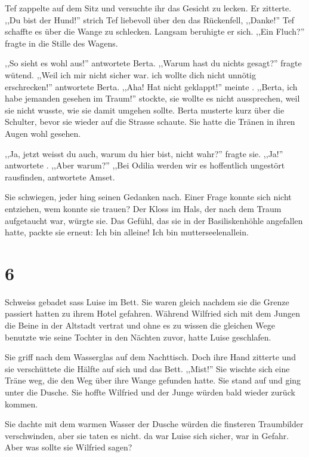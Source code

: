 Tef zappelte auf dem Sitz und versuchte ihr das Gesicht zu lecken. Er zitterte. ,,Du bist der Hund!'' \am strich Tef liebevoll über den das Rückenfell, ,,Danke!'' Tef schaffte es \am über die Wange zu schlecken. Langsam beruhigte er sich. ,,Ein Fluch?'' fragte \am in die Stille des Wagens. 

,,So sieht es wohl aus!'' antwortete Berta. ,,Warum hast du nichts gesagt?'' fragte \am wütend. ,,Weil ich mir nicht sicher war. ich wollte dich nicht unnötig erschrecken!'' antwortete Berta. ,,Aha! Hat nicht geklappt!'' meinte \am . ,,Berta, ich habe jemanden gesehen im Traum!'' \am stockte, sie wollte es nicht aussprechen, weil sie nicht wusste, wie sie damit umgehen sollte. Berta musterte \am kurz über die Schulter, bevor sie wieder auf die Strasse schaute. Sie hatte die Tränen in ihren Augen wohl gesehen. 

,,Ja, jetzt weisst du auch, warum du hier bist, nicht wahr?'' fragte sie. ,,Ja!'' antwortete \am . ,,Aber warum?'' ,,Bei Odilia werden wir es hoffentlich ungestört rausfinden, antwortete Amset. 

Sie schwiegen, jeder hing seinen Gedanken nach. Einer Frage konnte \am sich nicht entziehen, wem konnte sie trauen? Der Kloss im Hals, der nach dem Traum aufgetaucht war, würgte sie. Das Gefühl, das sie in der Basiliskenhöhle angefallen hatte, packte sie erneut: Ich bin alleine! Ich bin mutterseelenallein.

\section*{6}

Schweiss gebadet sass Luise im Bett. Sie waren gleich nachdem sie die Grenze passiert hatten zu ihrem Hotel gefahren. Während Wilfried sich mit dem Jungen die Beine in der Altstadt vertrat und ohne es zu wissen die gleichen Wege benutzte wie seine Tochter in den Nächten zuvor, hatte Luise geschlafen.

Sie griff nach dem Wasserglas auf dem Nachttisch. Doch ihre Hand zitterte und sie verschüttete die Hälfte auf sich und das Bett. ,,Mist!'' Sie wischte sich eine Träne weg, die den Weg über ihre Wange gefunden hatte. Sie stand auf und ging unter die Dusche. Sie hoffte Wilfried und der Junge würden bald wieder zurück kommen.

Sie dachte mit dem warmen Wasser der Dusche würden die finsteren Traumbilder verschwinden, aber sie taten es nicht. da war Luise sich sicher, \am war in Gefahr. Aber was sollte sie Wilfried sagen?


